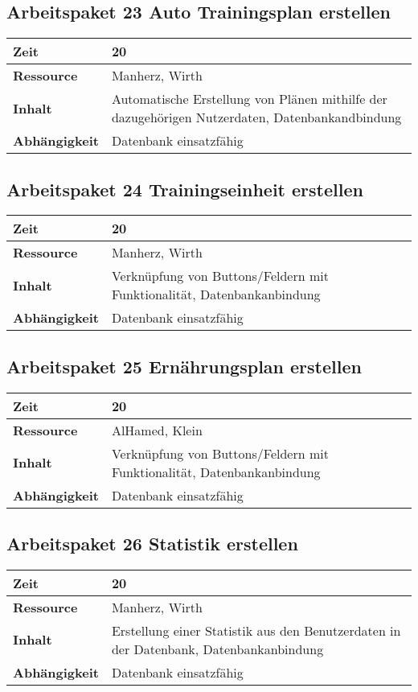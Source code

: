 \documentclass[12pt,a4paper,onecolumn]{article}
\begin{document}
\subsection{Arbeitspaket 23 Auto Trainingsplan erstellen}
\begin{tabularx}{\textwidth}{|l|X|}
\hline
     \textbf{Zeit} & 20 \\
     \hline
     \textbf{Ressource} & Manherz, Wirth\\
     \hline
     \textbf{Inhalt} &  Automatische Erstellung von Plänen mithilfe der dazugehörigen Nutzerdaten, Datenbankandbindung\\
     \hline
     \textbf{Abhängigkeit} & Datenbank einsatzfähig\\
\hline
\end{tabularx}

\subsection{Arbeitspaket 24 Trainingseinheit erstellen}
\begin{tabularx}{\textwidth}{|l|X|}
\hline
     \textbf{Zeit} & 20 \\
     \hline
     \textbf{Ressource} & Manherz, Wirth \\
     \hline
     \textbf{Inhalt} &  Verknüpfung von Buttons/Feldern mit Funktionalität, Datenbankanbindung\\
     \hline
     \textbf{Abhängigkeit} & Datenbank einsatzfähig\\
\hline
\end{tabularx}

\subsection{Arbeitspaket 25 Ernährungsplan erstellen}
\begin{tabularx}{\textwidth}{|l|X|}
\hline
     \textbf{Zeit} & 20 \\
     \hline
     \textbf{Ressource} & AlHamed, Klein\\
     \hline
     \textbf{Inhalt} &  Verknüpfung von Buttons/Feldern mit Funktionalität, Datenbankanbindung\\
     \hline
     \textbf{Abhängigkeit} & Datenbank einsatzfähig\\
\hline
\end{tabularx}

\subsection{Arbeitspaket 26 Statistik erstellen}
\begin{tabularx}{\textwidth}{|l|X|}
\hline
     \textbf{Zeit} & 20\\
     \hline
     \textbf{Ressource} & Manherz, Wirth\\
     \hline
     \textbf{Inhalt} & Erstellung einer Statistik aus den Benutzerdaten in der Datenbank, Datenbankanbindung\\
     \hline
     \textbf{Abhängigkeit} & Datenbank einsatzfähig\\
\hline
\end{tabularx}
\end{document}
